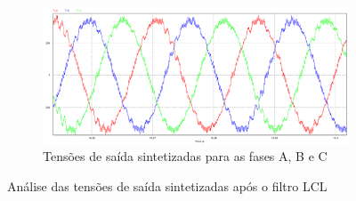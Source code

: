 \begin{figure}[!hbt]
	\begin{subfigure}[b]{0.5\textwidth}
		\centering
		\includegraphics[width=\textwidth]{figuras/sim_figures/sistema_completo/tensao_saida_inversor_4.PNG}
		\caption{Tensões de saída sintetizadas para as fases A, B e C}
	\end{subfigure}
    \caption{Análise das tensões de saída sintetizadas após o filtro LCL}
    \label{fig:sim-tensao-saida-inversor}
\end{figure}

